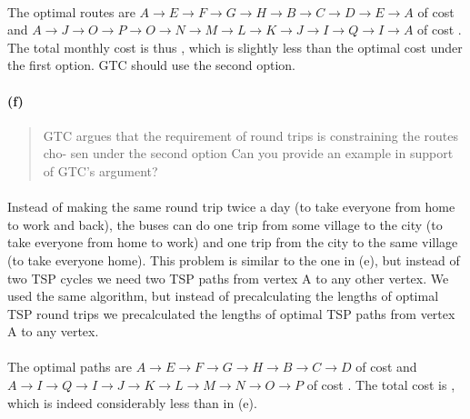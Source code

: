 \paragraph{}
The optimal routes are $ A \rightarrow E \rightarrow F \rightarrow G \rightarrow H \rightarrow B \rightarrow C \rightarrow D \rightarrow E \rightarrow A $ of cost  and $ A \rightarrow J \rightarrow O \rightarrow P \rightarrow O \rightarrow N \rightarrow M \rightarrow L \rightarrow K \rightarrow J \rightarrow I \rightarrow Q \rightarrow I \rightarrow A $ of cost . The total monthly cost is thus , which is slightly less than the optimal cost under the first option. GTC should use the second option.

\paragraph{(f)}
\begin{quote}
GTC argues that the requirement of round trips is constraining the routes cho-
sen under the second option Can you provide an example in support of GTC’s argument?
\end{quote}

\paragraph{}
Instead of making the same round trip twice a day (to take everyone from home to work and back), the buses can do one trip from some village to the city (to take everyone from home to work) and one trip from the city to the same village (to take everyone home). This problem is similar to the one in (e), but instead of two TSP cycles we need two TSP paths from vertex A to any other vertex. We used the same algorithm, but instead of precalculating the lengths of optimal TSP round trips we precalculated the lengths of optimal TSP paths from vertex A to any vertex.

\paragraph{}
The optimal paths are $ A \rightarrow E \rightarrow F \rightarrow G \rightarrow H \rightarrow B \rightarrow C \rightarrow D $ of cost  and $ A \rightarrow I \rightarrow Q \rightarrow I \rightarrow J \rightarrow K \rightarrow L \rightarrow M \rightarrow N \rightarrow O \rightarrow P $ of cost . The total cost is , which is indeed considerably less than in (e).
